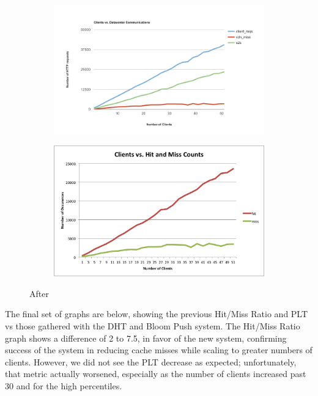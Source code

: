 \documentclass[conference]{IEEEtran}
\begin{document}
\begin{figure}[!h]
	\centering
	\begin{subfigure}[b]{0.49\columnwidth}
		\centering
		\includegraphics[width=\columnwidth]{figures/client-server_1.png}
	\end{subfigure}
	\begin{subfigure}[b]{0.49\columnwidth}
		\centering
		\includegraphics[width=\columnwidth]{figures/hit_miss_separate_1.png}
	\end{subfigure}
	\caption{After}
\end{figure}

The final set of graphs are below, showing the previous Hit/Miss Ratio and PLT vs those gathered with the DHT and Bloom Push system. The Hit/Miss Ratio graph shows a difference of 2 to 7.5, in favor of the new system, confirming success of the system in reducing cache misses while scaling to greater numbers of clients. However, we did not see the PLT decrease as expected; unfortunately, that metric actually worsened, especially as the number of clients increased past 30 and for the high percentiles.
\end{document}
